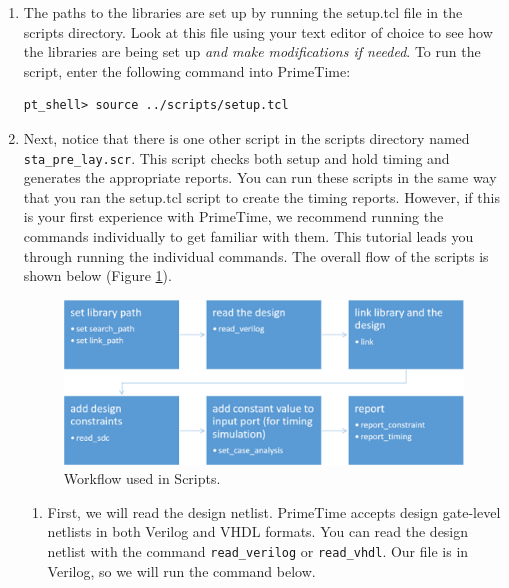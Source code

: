 \documentclass[a4paper,12pt,twoside]{article}
\begin{document}
\begin{enumerate}
\begin{verbatim}
Suppressed Messages Summary:
Id          Severity      Occurrences   Suppressed
-------------------------------------------------------------------------------
CMD-005     Error                  12           12
Total 1 type of message is suppressed
    \end{verbatim}
    Please read Appendix: Troubleshooting \ref{ALC}.
    \item The paths to the libraries are set up by running the setup.tcl file in the scripts directory. Look at this file using your text editor of choice to see how the libraries are being set up \textit{and make modifications if needed}. To run the script, enter the following command into PrimeTime:
    \begin{verbatim}
pt_shell> source ../scripts/setup.tcl
    \end{verbatim}
    \item Next, notice that there is one other script in the scripts directory named \texttt{sta\_pre\_lay.scr}. This script checks both setup and hold timing and generates the appropriate reports. You can run these scripts in the same way that you ran the setup.tcl script to create the timing reports. However, if this is your first experience with PrimeTime, we recommend running the commands individually to get familiar with them. This tutorial leads you through running the individual commands. The overall flow of the scripts is shown below (Figure \ref{f33}).
    \begin{figure}[H]
        \centering
        \includegraphics[width=\textwidth]{images/33.png}
        \caption{Workflow used in Scripts.}
        \label{f33}
    \end{figure}
    \begin{enumerate}
        \item First, we will read the design netlist. PrimeTime accepts design gate-level netlists in both Verilog and VHDL formats. You can read the design netlist with the command \texttt{read\_verilog} or \texttt{read\_vhdl}. Our file is in Verilog, so we will run the command below.

\end{enumerate}
\end{enumerate}
\end{document}
